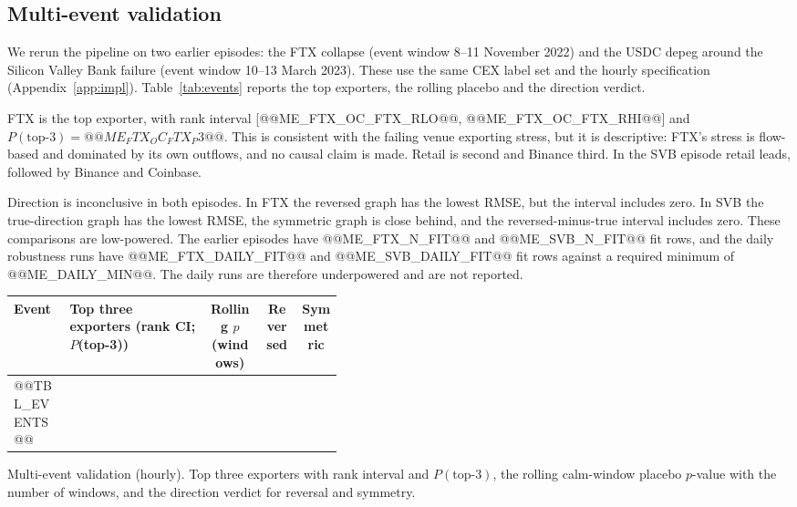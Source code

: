 \documentclass[referee,pdflatex,sn-mathphys-ay]{sn-jnl}
\newcommand{\fitbox}{\ifdim\wd\tabbox>\linewidth\resizebox{\linewidth}{!}{\usebox{\tabbox}}\else\usebox{\tabbox}\fi}%
\theoremstyle{thmstyleone}%
\theoremstyle{thmstyletwo}%
\theoremstyle{thmstylethree}%
\begin{document}
\subsection{Multi-event validation}
\label{subsec:multievent}
We rerun the pipeline on two earlier episodes: the FTX collapse (event window 8--11 November 2022) and the USDC depeg
around the Silicon Valley Bank failure (event window 10--13 March 2023). These use the same CEX label set and the
hourly specification (Appendix~\ref{app:impl}). Table~\ref{tab:events} reports the top exporters, the rolling placebo and the direction verdict.

FTX is the top exporter, with rank interval [@@ME_FTX_OC_FTX_RLO@@, @@ME_FTX_OC_FTX_RHI@@] and $P(\text{top-3})=@@ME_FTX_OC_FTX_P3@@$. This is
consistent with the failing venue exporting stress, but it is descriptive: FTX's stress is flow-based and dominated by its own
outflows, and no causal claim is made. Retail is second and Binance third. In the SVB episode retail leads, followed by Binance and Coinbase.

Direction is inconclusive in both episodes. In FTX the reversed graph has the lowest RMSE, but the interval includes zero.
In SVB the true-direction graph has the lowest RMSE, the symmetric graph is close behind, and the reversed-minus-true interval includes zero. These comparisons are low-powered.
The earlier episodes have @@ME_FTX_N_FIT@@ and @@ME_SVB_N_FIT@@ fit rows, and the daily robustness runs have @@ME_FTX_DAILY_FIT@@ and
@@ME_SVB_DAILY_FIT@@ fit rows against a required minimum of @@ME_DAILY_MIN@@. The daily runs are therefore underpowered and are not reported.

\begin{lrbox}{\tabbox}\footnotesize\setlength{\tabcolsep}{3pt}%
\begin{tabular}{@{}lp{0.42\linewidth}ccc@{}}
\toprule
\textbf{Event} & \textbf{Top three exporters (rank CI; $P$(top-3))} & \textbf{Rolling $p$ (windows)} & \textbf{Reversed} & \textbf{Symmetric}\\
\midrule
@@TBL_EVENTS@@
\bottomrule
\end{tabular}
\end{lrbox}
\begin{tableorg}[tbp]
\centering
\caption{Multi-event validation (hourly). Top three exporters with rank interval and $P(\text{top-3})$, the rolling
calm-window placebo $p$-value with the number of windows, and the direction verdict for reversal and symmetry.}
\label{tab:events}
\fitbox
\end{tableorg}
\end{document}
